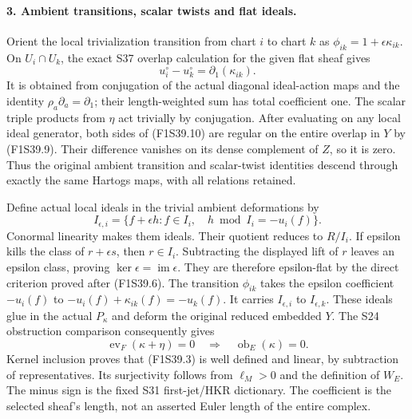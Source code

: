 \paragraph{3. Ambient transitions, scalar twists and flat ideals.}
Orient the local trivialization transition
from chart $i$ to chart $k$ as
$\phi_{ik}=1+\epsilon\kappa_{ik}$.
On $U_i\cap U_k$, the exact S37 overlap
calculation for the given flat sheaf gives
\[
              u_i^\circ-u_k^\circ
                     =\partial_1(\kappa_{ik}).
 \tag{F1S39.10}
\]
It is obtained from conjugation of the actual
diagonal ideal-action maps and the identity
$\rho_a\partial_a=\partial_1$; their
length-weighted sum has total coefficient one.
The scalar triple products from $\eta$
act trivially by conjugation. After evaluating
on any local ideal generator, both sides of
(F1S39.10) are regular on the entire overlap
in $Y$ by (F1S39.9). Their difference vanishes
on its dense complement of $Z$, so it is zero.
Thus the original ambient transition and
scalar-twist identities descend through exactly
the same Hartogs maps, with all relations retained.

Define actual local ideals in the trivial
ambient deformations by
\[
 I_{\epsilon,i}=\{f+\epsilon h:
          f\in I_i,\quad h\bmod I_i=-u_i(f)\}.
 \tag{F1S39.11}
\]
Conormal linearity makes them ideals.
Their quotient reduces to $R/I_i$.
If epsilon kills the class of $r+\epsilon s$,
then $r\in I_i$. Subtracting the displayed
lift of $r$ leaves an epsilon class, proving
$\ker\epsilon=\operatorname{im}\epsilon$.
They are therefore epsilon-flat by the direct
criterion proved after (F1S39.6).
The transition $\phi_{ik}$ takes the epsilon
coefficient $-u_i(f)$ to
$-u_i(f)+\kappa_{ik}(f)=-u_k(f)$.
It carries $I_{\epsilon,i}$ to $I_{\epsilon,k}$.
These ideals glue in the actual $P_\kappa$
and deform the original reduced embedded $Y$.
The S24 obstruction comparison consequently gives
\[
 \operatorname{ev}_F(\kappa+\eta)=0
              \quad\Longrightarrow\quad
                        \operatorname{ob}_E(\kappa)=0.
 \tag{F1S39.12}
\]
Kernel inclusion proves that (F1S39.3) is
well defined and linear, by subtraction of
representatives. Its surjectivity follows from
$\ell_M>0$ and the definition of $W_E$.
The minus sign is the fixed S31 first-jet/HKR
dictionary. The coefficient is the selected
sheaf's length, not an asserted Euler length
of the entire complex.

